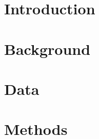 \documentclass[11pt, english, letterpaper]{article}
\begin{document}
\newpage 

\listoftodos

\newpage



\vspace{-5mm} \section{Introduction}
\label{sec:intro}


\section{Background}
\label{sec:background}


\section{Data}
\label{sec:data}


\section{Methods}
\label{sec:methods}


% 

% 

\newpage
\printbibliography

% 
\end{document}
